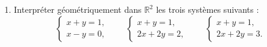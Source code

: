 \documentclass[11pt,a4paper]{article}
\theoremstyle{remark}
\newcommand{\R}{\mathbb{R}}
\begin{document}
\begin{enumerate}[label=\textbf{Exercice \arabic*.}]
    \item Interpréter géométriquement dans \(\R^2\) les trois systèmes suivants :
    \[
    \begin{cases}
    x+y=1,\\
    x-y=0,
    \end{cases}
    \qquad
    \begin{cases}
    x+y=1,\\
    2x+2y=2,
    \end{cases}
    \qquad
    \begin{cases}
    x+y=1,\\
    2x+2y=3.
    \end{cases}
    \]
\end{enumerate}
\end{document}
